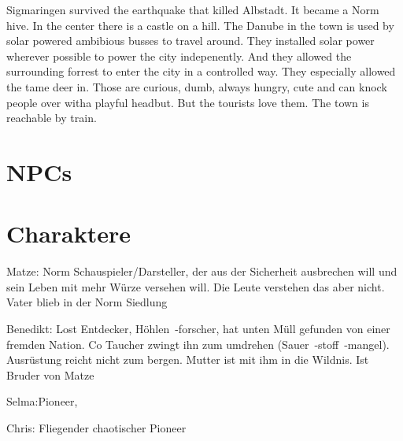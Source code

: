 Sigmaringen survived the earthquake that killed Albstadt. It became a Norm hive. In the center there is a castle on a hill. The Danube in the town is used by solar powered ambibious busses to travel around. They installed solar power wherever possible to power the city indepenently. And they allowed the surrounding forrest to enter the city in a controlled way. They especially allowed the tame deer in. Those are curious, dumb, always hungry, cute and can knock people over witha  playful headbut. But the tourists love them.
The town is reachable by train.


\section{NPCs}

\section{Charaktere}

Matze: Norm Schauspieler/Darsteller, der aus der Sicherheit ausbrechen will und sein Leben mit mehr Würze versehen will. Die Leute verstehen das aber nicht. Vater blieb in der Norm Siedlung

Benedikt: Lost Entdecker, Höhlen~-forscher, hat unten Müll gefunden von einer fremden Nation. Co Taucher zwingt ihn zum umdrehen (Sauer~-stoff~-mangel). 
Ausrüstung reicht nicht zum bergen. Mutter ist mit ihm in die Wildnis. Ist Bruder von Matze

Selma:Pioneer, 

Chris: Fliegender chaotischer Pioneer
